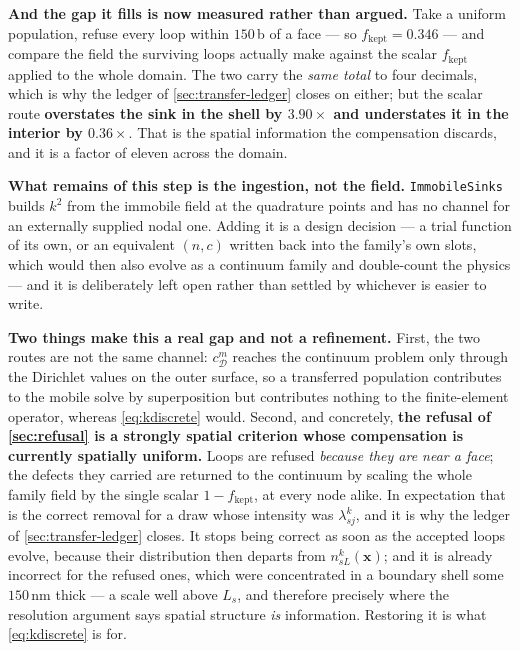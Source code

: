 \documentclass{article}
\newcommand{\code}[1]{\texttt{#1}}
\begin{document}
\textbf{And the gap it fills is now measured rather than argued.} Take a uniform
population, refuse every loop within $150\,$b of a face --- so
$f_{\mathrm{kept}}=0.346$ --- and compare the field the surviving loops actually
make against the scalar $f_{\mathrm{kept}}$ applied to the whole domain. The two
carry the \emph{same total} to four decimals, which is why the ledger of
\cref{sec:transfer-ledger} closes on either; but the scalar route
\textbf{overstates the sink in the shell by $3.90\times$ and understates it in
the interior by $0.36\times$}. That is the spatial information the compensation
discards, and it is a factor of eleven across the domain.

\textbf{What remains of this step is the ingestion, not the field.}
\code{ImmobileSinks} builds $k^2$ from the immobile field at the quadrature
points and has no channel for an externally supplied nodal one. Adding it is a
design decision --- a trial function of its own, or an equivalent $(n,c)$
written back into the family's own slots, which would then also evolve as a
continuum family and double-count the physics --- and it is deliberately left
open rather than settled by whichever is easier to write.

\textbf{Two things make this a real gap and not a refinement.} First, the two
routes are not the same channel: $c^m_{\mathcal D}$ reaches the continuum problem
only through the Dirichlet values on the outer surface, so a transferred
population contributes to the mobile solve by superposition but contributes
nothing to the finite-element operator, whereas \cref{eq:kdiscrete} would.
Second, and concretely, \textbf{the refusal of \cref{sec:refusal} is a strongly
spatial criterion whose compensation is currently spatially uniform.} Loops are
refused \emph{because they are near a face}; the defects they carried are
returned to the continuum by scaling the whole family field by the single scalar
$1-f_{\mathrm{kept}}$, at every node alike. In expectation that is the correct
removal for a draw whose intensity was $\lambda^k_{sj}$, and it is why the ledger
of \cref{sec:transfer-ledger} closes. It stops being correct as soon as the
accepted loops evolve, because their distribution then departs from
$n^k_{sL}(\bm x)$; and it is already incorrect for the refused ones, which were
concentrated in a boundary shell some $150$\,nm thick --- a scale well above
$L_s$, and therefore precisely where the resolution argument says spatial
structure \emph{is} information. Restoring it is what \cref{eq:kdiscrete} is for.
\end{document}
